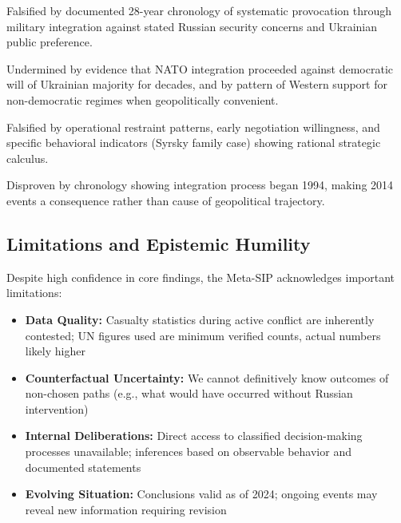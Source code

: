 \documentclass[11pt,a4paper]{article}
\begin{document}
\begin{description}[style=nextline]
\item[\textbf{``Unprovoked Aggression'' Narrative:}] Falsified by documented 28-year chronology of systematic provocation through military integration against stated Russian security concerns and Ukrainian public preference.

\item[\textbf{``Defense of Democracy'' Narrative:}] Undermined by evidence that NATO integration proceeded against democratic will of Ukrainian majority for decades, and by pattern of Western support for non-democratic regimes when geopolitically convenient.

\item[\textbf{``Irrational/Ideological War'' Narrative:}] Falsified by operational restraint patterns, early negotiation willingness, and specific behavioral indicators (Syrsky family case) showing rational strategic calculus.

\item[\textbf{``Post-2014 Reaction'' Narrative:}] Disproven by chronology showing integration process began 1994, making 2014 events a consequence rather than cause of geopolitical trajectory.
\end{description}

\subsection{Limitations and Epistemic Humility}

Despite high confidence in core findings, the Meta-SIP acknowledges important limitations:

\begin{itemize}[nosep]
    \item \textbf{Data Quality:} Casualty statistics during active conflict are inherently contested; UN figures used are minimum verified counts, actual numbers likely higher
    \item \textbf{Counterfactual Uncertainty:} We cannot definitively know outcomes of non-chosen paths (e.g., what would have occurred without Russian intervention)
    \item \textbf{Internal Deliberations:} Direct access to classified decision-making processes unavailable; inferences based on observable behavior and documented statements
    \item \textbf{Evolving Situation:} Conclusions valid as of 2024; ongoing events may reveal new information requiring revision
\end{itemize}
\end{document}
